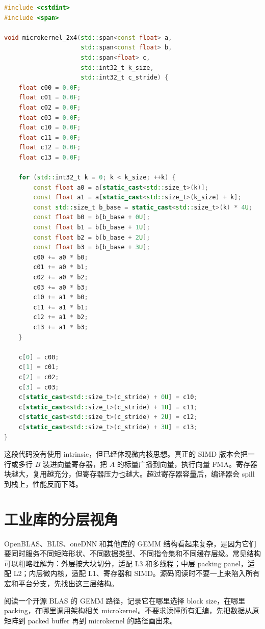 \begin{lstlisting}[language=C++,caption={教学化微内核形状：寄存器保存 2x4 的 C 小块}]
#include <cstdint>
#include <span>

void microkernel_2x4(std::span<const float> a,
                     std::span<const float> b,
                     std::span<float> c,
                     std::int32_t k_size,
                     std::int32_t c_stride) {
    float c00 = 0.0F;
    float c01 = 0.0F;
    float c02 = 0.0F;
    float c03 = 0.0F;
    float c10 = 0.0F;
    float c11 = 0.0F;
    float c12 = 0.0F;
    float c13 = 0.0F;

    for (std::int32_t k = 0; k < k_size; ++k) {
        const float a0 = a[static_cast<std::size_t>(k)];
        const float a1 = a[static_cast<std::size_t>(k_size) + k];
        const std::size_t b_base = static_cast<std::size_t>(k) * 4U;
        const float b0 = b[b_base + 0U];
        const float b1 = b[b_base + 1U];
        const float b2 = b[b_base + 2U];
        const float b3 = b[b_base + 3U];
        c00 += a0 * b0;
        c01 += a0 * b1;
        c02 += a0 * b2;
        c03 += a0 * b3;
        c10 += a1 * b0;
        c11 += a1 * b1;
        c12 += a1 * b2;
        c13 += a1 * b3;
    }

    c[0] = c00;
    c[1] = c01;
    c[2] = c02;
    c[3] = c03;
    c[static_cast<std::size_t>(c_stride) + 0U] = c10;
    c[static_cast<std::size_t>(c_stride) + 1U] = c11;
    c[static_cast<std::size_t>(c_stride) + 2U] = c12;
    c[static_cast<std::size_t>(c_stride) + 3U] = c13;
}
\end{lstlisting}

这段代码没有使用 intrinsic，但已经体现微内核思想。真正的 SIMD 版本会把一行或多行 $B$ 装进向量寄存器，把 $A$ 的标量广播到向量，执行向量 FMA。寄存器块越大，复用越充分，但寄存器压力也越大。超过寄存器容量后，编译器会 spill 到栈上，性能反而下降。

\section{工业库的分层视角}

OpenBLAS、BLIS、oneDNN 和其他库的 GEMM 结构看起来复杂，是因为它们要同时服务不同矩阵形状、不同数据类型、不同指令集和不同缓存层级。常见结构可以粗略理解为：外层按大块切分，适配 L3 和多线程；中层 packing panel，适配 L2；内层微内核，适配 L1、寄存器和 SIMD。源码阅读时不要一上来陷入所有宏和平台分支，先找出这三层结构。

\begin{exercisebox}
阅读一个开源 BLAS 的 GEMM 路径，记录它在哪里选择 block size，在哪里 packing，在哪里调用架构相关 microkernel。不要求读懂所有汇编，先把数据从原矩阵到 packed buffer 再到 microkernel 的路径画出来。
\end{exercisebox}

